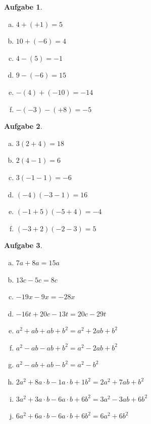 \documentclass[12pt,fleqn]{article}
\theoremstyle{aufg}
\newtheorem{aufgabe}{Aufgabe}
\theoremstyle{bsp}
\begin{document}
 
    \begin{flushleft}
\begin{aufgabe} ~ \\ 
\begin{multicols}{3} 
\begin{enumerate}[a)] 
\item 
$4+(+1)=5$
\item 
$10+(-6)=4$
\item 
$4-(5)=-1$
\item 
$9-(-6)=15$
\item 
$-(4)+(-10)=-14$
\item 
$-(-3)-(+8)=-5$
\end{enumerate} 
\end{multicols} 
\end{aufgabe} 
\begin{aufgabe} ~ \\ 
\begin{multicols}{3} 
\begin{enumerate}[a)] 
\item 
$3(2+4)=18$
\item 
$2(4-1)=6$
\item 
$3(-1-1)=-6$
\item 
$(-4)(-3-1)=16$
\item 
$(-1+5)(-5+4)=-4$
\item 
$(-3+2)(-2-3)=5$
\end{enumerate} 
\end{multicols} 
\end{aufgabe} 
\begin{aufgabe} ~ \\ 
\begin{multicols}{2} 
\begin{enumerate}[a)] 
\item 
$7a+8a=15 a$
\item 
$13c-5c=8 c$
\item 
$-19x-9x=- 28 x$
\item 
$-16t+20c-13t=20 c - 29 t$
\item 
$a^2+ab+ab+b^2=a^{2} + 2 a b + b^{2}$
\item 
$a^2-ab-ab+b^2=a^{2} - 2 a b + b^{2}$
\item 
$a^2-ab+ab-b^2=a^{2} - b^{2}$
\item 
$2a^2+8a\cdot b-1a\cdot b+1b^2=2 a^{2} + 7 a b + b^{2}$
\item 
$3a^2+3a\cdot b-6a\cdot b+6b^2=3 a^{2} - 3 a b + 6 b^{2}$
\item 
$6a^2+6a\cdot b-6a\cdot b+6b^2=6 a^{2} + 6 b^{2}$

\end{enumerate}
\end{multicols}
\end{aufgabe}
\end{flushleft}
\end{document}
